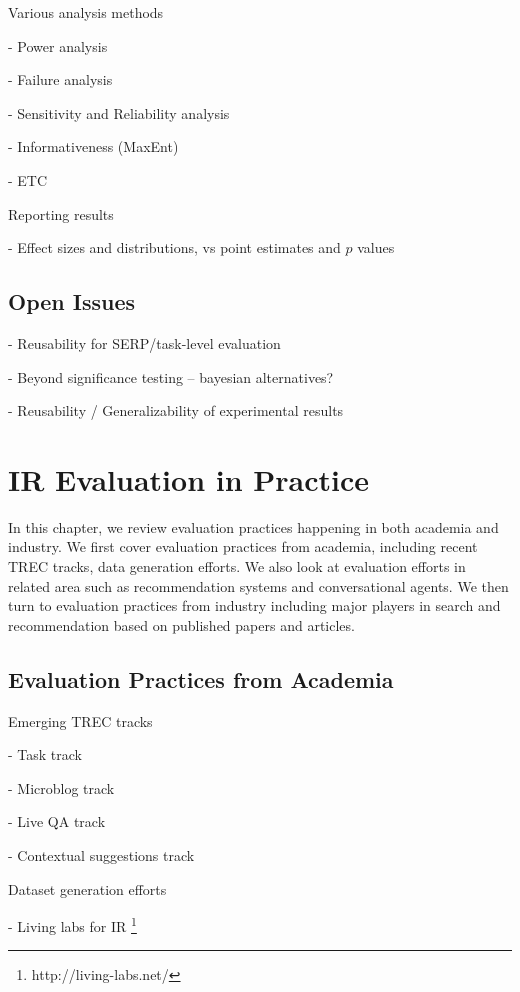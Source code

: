 \documentclass[openany]{now} %
\newcommand{\newpar}{\bigskip\noindent}
\begin{document}
\newpar
Various analysis methods

- Power analysis \cite{Sakai:2014}

- Failure analysis

- Sensitivity and Reliability analysis \cite{Urbano:2013} 

- Informativeness (MaxEnt) \cite{AslamYP05}

- ETC \cite{Bron:2013} \cite{Boytsov:2013}  \cite{Robertson:2012}

\newpar
Reporting results

- Effect sizes and distributions, vs point estimates and $p$ values

\section{Open Issues}

- Reusability for SERP/task-level evaluation

- Beyond significance testing -- bayesian alternatives?

- Reusability / Generalizability of experimental results


\chapter{IR Evaluation in Practice}
\label{c-practice}

In this chapter, we review evaluation practices happening in both academia and industry. We first cover evaluation practices from academia, including recent TREC tracks, data generation efforts. We also look at evaluation efforts in related area such as recommendation systems and conversational agents. We then turn to evaluation practices from industry including major players in search and recommendation based on published papers and articles.

\section{Evaluation Practices from Academia}

Emerging TREC tracks

- Task track

- Microblog track

- Live QA track

- Contextual suggestions track

\newpar
Dataset generation efforts

- Living labs for IR \footnote{http://living-labs.net/}
\end{document}

